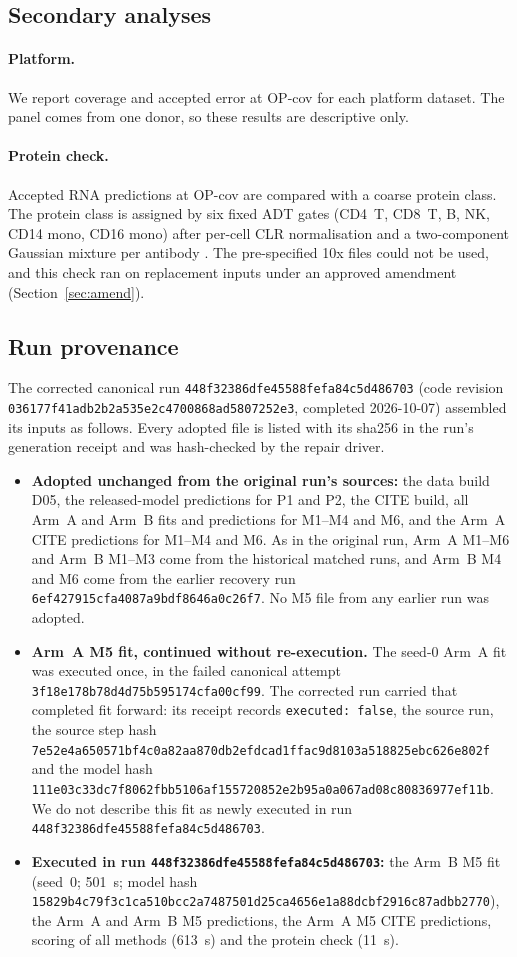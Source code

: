 \documentclass[11pt]{article}
\newcommand{\runid}{\nolinkurl{448f32386dfe45588fefa84c5d486703}}
\begin{document}
\subsection{Secondary analyses}

\paragraph{Platform.} We report coverage and accepted error at OP-cov for each platform dataset. The panel comes from one donor, so these results are descriptive only.

\paragraph{Protein check.} Accepted RNA predictions at OP-cov are compared with a coarse protein class. The protein class is assigned by six fixed ADT gates (CD4~T, CD8~T, B, NK, CD14 mono, CD16 mono) after per-cell CLR normalisation and a two-component Gaussian mixture per antibody \citep{stoeckius2017citeseq}. The pre-specified 10x files could not be used, and this check ran on replacement inputs under an approved amendment (Section~\ref{sec:amend}).

\subsection{Run provenance}\label{sec:provenance}

The corrected canonical run \runid{} (code revision \nolinkurl{036177f41adb2b2a535e2c4700868ad5807252e3}, completed 2026-10-07) assembled its inputs as follows. Every adopted file is listed with its sha256 in the run's generation receipt and was hash-checked by the repair driver.
\begin{itemize}
\item \textbf{Adopted unchanged from the original run's sources:} the data build D05, the released-model predictions for P1 and P2, the CITE build, all Arm~A and Arm~B fits and predictions for M1--M4 and M6, and the Arm~A CITE predictions for M1--M4 and M6. As in the original run, Arm~A M1--M6 and Arm~B M1--M3 come from the historical matched runs, and Arm~B M4 and M6 come from the earlier recovery run \nolinkurl{6ef427915cfa4087a9bdf8646a0c26f7}. No M5 file from any earlier run was adopted.
\item \textbf{Arm~A M5 fit, continued without re-execution.} The seed-0 Arm~A fit was executed once, in the failed canonical attempt \nolinkurl{3f18e178b78d4d75b595174cfa00cf99}. The corrected run carried that completed fit forward: its receipt records \verb|executed: false|, the source run, the source step hash \nolinkurl{7e52e4a650571bf4c0a82aa870db2efdcad1ffac9d8103a518825ebc626e802f} and the model hash \nolinkurl{111e03c33dc7f8062fbb5106af155720852e2b95a0a067ad08c80836977ef11b}. We do not describe this fit as newly executed in run \runid.
\item \textbf{Executed in run \runid:} the Arm~B M5 fit (seed~0; 501~s; model hash \nolinkurl{15829b4c79f3c1ca510bcc2a7487501d25ca4656e1a88dcbf2916c87adbb2770}), the Arm~A and Arm~B M5 predictions, the Arm~A M5 CITE predictions, scoring of all methods (613~s) and the protein check (11~s).
\end{itemize}
\end{document}

